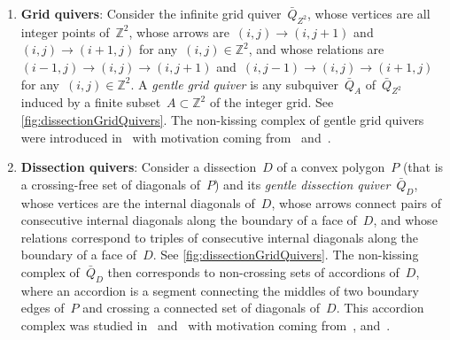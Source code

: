 \documentclass{amsart}
\theoremstyle{definition}
\newcommand{\Z}{\mathbb{Z}} %
\newcommand{\darkblue}{\color{darkblue}} %
\newcommand{\defn}[1]{\textsl{\darkblue #1}} %
\newcommand{\quiver}{\bar Q} %
\begin{document}
\medskip
\begin{enumerate}[(1)]
\item \textbf{Grid quivers}: Consider the infinite grid quiver~$\quiver_{Z^2}$, whose vertices are all integer points of~$\Z^2$, whose arrows are~$(i,j) \longrightarrow (i,j+1)$ and~$(i,j) \longrightarrow (i+1,j)$ for any~$(i,j) \in \Z^2$, and whose relations are~$(i-1,j) \longrightarrow (i,j) \longrightarrow (i,j+1)$ and~$(i,j-1) \longrightarrow (i,j) \longrightarrow (i+1,j)$ for any~$(i,j) \in \Z^2$. A \defn{gentle grid quiver} is any subquiver~$\quiver_A$ of~$\quiver_{Z^2}$ induced by a finite subset~$A \subset \Z^2$ of the integer grid. See \cref{fig:dissectionGridQuivers}. The non-kissing complex of gentle grid quivers were introduced in~\cite{McConville} with motivation coming from~\cite{PetersenPylyavskyySpeyer} and~\cite{SantosStumpWelker}. 

\medskip
\item \textbf{Dissection quivers}: Consider a dissection~$D$ of a convex polygon~$P$ (that is a crossing-free set of diagonals of~$P$) and its \defn{gentle dissection quiver}~$\quiver_D$, whose vertices are the internal diagonals of~$D$, whose arrows connect pairs of consecutive internal diagonals along the boundary of a face of~$D$, and whose relations correspond to triples of consecutive internal diagonals along the boundary of a face of~$D$. See \cref{fig:dissectionGridQuivers}. The non-kissing complex of~$\quiver_D$ then corresponds to non-crossing sets of accordions of~$D$, where an accordion is a segment connecting the middles of two boundary edges of~$P$ and crossing a connected set of diagonals of~$D$. This accordion complex was studied in~\cite{GarverMcConville} and~\cite{MannevillePilaud-accordion} with motivation coming from~\cite{Baryshnikov}, and~\cite{Chapoton-quadrangulations}.
\end{enumerate}
\end{document}

